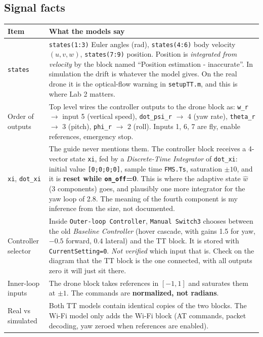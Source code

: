 \documentclass[10pt,a4paper]{article}
\begin{document}
\subsection*{Signal facts}

\begin{tabularx}{\textwidth}{@{}l X@{}}
\toprule
Item & What the models say\\
\midrule
\texttt{states} & \texttt{states(1:3)} Euler angles (rad), \texttt{states(4:6)} body velocity $(u,v,w)$, \texttt{states(7:9)} position. Position is \emph{integrated from velocity} by the block named ``Position estimation - inaccurate''. In simulation the drift is whatever the model gives. On the real drone it is the optical-flow warning in \texttt{setupTT.m}, and this is where Lab 2 matters.\\
Order of outputs & Top level wires the controller outputs to the drone block as: \texttt{w\_r} $\to$ input 5 (vertical speed), \texttt{dot\_psi\_r} $\to$ 4 (yaw rate), \texttt{theta\_r} $\to$ 3 (pitch), \texttt{phi\_r} $\to$ 2 (roll). Inputs 1, 6, 7 are fly, enable references, emergency stop.\\
\texttt{xi}, \texttt{dot\_xi} & The guide never mentions them. The controller block receives a 4-vector state \texttt{xi}, fed by a \emph{Discrete-Time Integrator} of \texttt{dot\_xi}: initial value \texttt{[0;0;0;0]}, sample time \texttt{FMS.Ts}, saturation $\pm 10$, and it is \textbf{reset while \texttt{on\_off}=0}. This is where the adaptive state $\hat w$ (3 components) goes, and plausibly one more integrator for the yaw loop of 2.8. The meaning of the fourth component is my inference from the size, not documented.\\
Controller selector & Inside \texttt{Outer-loop Controller}, \texttt{Manual Switch3} chooses between the old \emph{Baseline Controller} (hover cascade, with gains 1.5 for yaw, $-0.5$ forward, $0.4$ lateral) and the TT block. It is stored with \texttt{CurrentSetting=0}. \emph{Not verified} which input that is. Check on the diagram that the TT block is the one connected, with all outputs zero it will just sit there.\\
Inner-loop inputs & The drone block takes references in $[-1,1]$ and saturates them at $\pm 1$. The commands are \textbf{normalized, not radians}.\\
Real vs simulated & Both TT models contain identical copies of the two blocks. The Wi-Fi model only adds the Wi-Fi block (AT commands, packet decoding, yaw zeroed when references are enabled).\\
\bottomrule
\end{tabularx}
\end{document}
